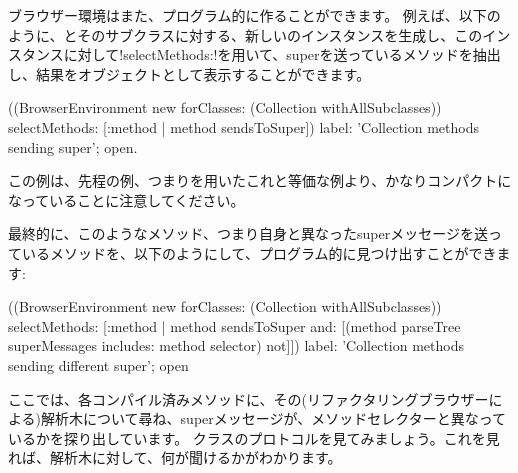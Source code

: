 \documentclass[a4paper,10pt,twoside]{book}
\begin{document}
ブラウザー環境はまた、プログラム的に作ることができます。
例えば、以下のように、とそのサブクラスに対する、新しいのインスタンスを生成し、このインスタンスに対して\ct!selectMethods:!を用いて、superを送っているメソッドを抽出し、結果をオブジェクトとして表示することができます。
\begin{code}{}
((BrowserEnvironment new forClasses: (Collection withAllSubclasses))
	selectMethods: [:method | method sendsToSuper])
	label: 'Collection methods sending super';
	open.
\end{code}{}

この例は、先程の例、つまりを用いたこれと等価な例より、かなりコンパクトになっていることに注意してください。%

最終的に、このようなメソッド、つまり自身と異なったsuperメッセージを送っているメソッドを、以下のようにして、プログラム的に見つけ出すことができます:
\begin{code}{}
((BrowserEnvironment new forClasses: (Collection withAllSubclasses))
	selectMethods: [:method | 
		method sendsToSuper
		and: [(method parseTree superMessages includes: method selector) not]])
	label: 'Collection methods sending different super';
	open
\end{code}
ここでは、各コンパイル済みメソッドに、その(リファクタリングブラウザーによる)解析木について尋ね、superメッセージが、メソッドセレクターと異なっているかを探り出しています。%
クラスのプロトコルを見てみましょう。これを見れば、解析木に対して、何が聞けるかがわかります。%

\end{document}
